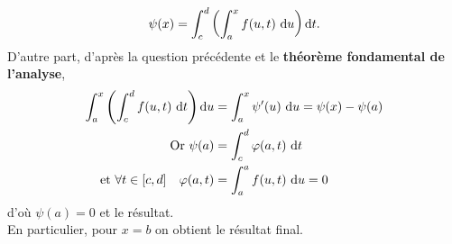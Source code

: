 \begin{preuve}
\begin{enumerate}
        $$\psi(x) = \int_{c}^{d} \left ( \int_{a}^{x} f(u,t)\ \mathrm{d} u \right) \mathrm{d} t.$$
        D'autre part, d'après la question précédente et le \textbf{théorème fondamental de l'analyse}, 
        \begin{align*}
            \int_{a}^{x} \left ( \int_{c}^{d} f(u,t)\ \mathrm{d} t \right) \mathrm{d} u &= \int_{a}^{x} \psi'(u)\ \mathrm{d} u  = \psi(x) - \psi(a) \\
            \text{Or } \psi(a) &= \int_{c}^{d} \varphi(a, t)\ \mathrm{d} t \\
            \text{et } \forall t \in [c, d] \quad \varphi(a, t) &= \int_{a}^{a} f(u, t)\ \mathrm{d} u = 0
        \end{align*}
        d'où $\psi(a) = 0$ et le résultat. \\
        En particulier, pour $x = b$ on obtient le résultat final.
    \end{enumerate}
\end{preuve}    
